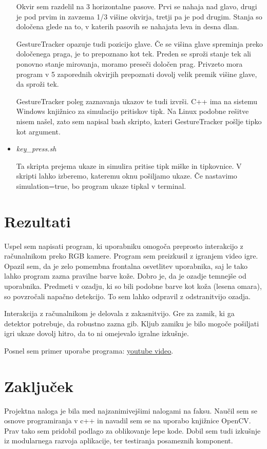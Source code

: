 \documentclass[a4paper, 12pt]{article}
\begin{document}
\begin{itemize}
Okvir sem razdelil na 3 horizontalne pasove. Prvi se nahaja nad glavo, drugi je pod prvim in zavzema 1/3 višine okvirja, tretji pa je pod drugim. Stanja so določena glede na to, v katerih pasovih se nahajata leva in desna dlan.

GestureTracker opazuje tudi pozicijo glave. Če se višina glave spreminja preko določenega praga, je to prepoznano kot tek. Preden se sproži stanje tek ali ponovno stanje mirovanja, moramo preseči določen prag. Privzeto mora program v 5 zaporednih okvirjih prepoznati dovolj velik premik višine glave, da sproži tek.

GestureTracker poleg zaznavanja ukazov te tudi izvrši. C++ ima na sistemu Windows knjižnico za simulacijo pritiskov tipk. Na Linux podobne rešitve nisem našel, zato sem napisal bash skripto, kateri GestureTracker pošlje tipko kot argument.

\item \emph{key\_press.sh}

Ta skripta prejema ukaze in simulira pritise tipk miške in tipkovnice. V skripti lahko izberemo, kateremu oknu pošiljamo ukaze. Če nastavimo simulation=true, bo program ukaze tipkal v terminal.

\end{itemize}


\section{Rezultati}

Uspel sem napisati program, ki uporabniku omogoča preprosto interakcijo z računalnikom preko RGB kamere. Program sem preizkusil z igranjem video igre. Opazil sem, da je zelo pomembna frontalna osvetlitev uporabnika, saj le tako lahko program zazna pravilne barve kože. Dobro je, da je ozadje temnejše od uporabnika. Predmeti v ozadju, ki so bili podobne barve kot koža (lesena omara), so povzročali napačno detekcijo. To sem lahko odpravil z odstranitvijo ozadja.

Interakcija z računalnikom je delovala z zakasnitvijo. Gre za zamik, ki ga detektor potrebuje, da robustno zazna gib. Kljub zamiku je bilo mogoče pošiljati igri ukaze dovolj hitro, da to ni omejevalo igralne izkušnje.

Posnel sem primer uporabe programa:
\href{https://www.youtube.com/watch?v=bAIwoVB_lPE}{youtube video}.

\section{Zaključek}

Projektna naloga je bila med najzanimivejšimi nalogami na faksu. Naučil sem se osnove programiranja v c++ in navadil sem se na uporabo knjižnice OpenCV. Prav tako sem pridobil podlago za oblikovanje lepe kode. Dobil sem tudi izkušnje iz modularnega razvoja aplikacije, ter testiranja posameznih komponent.
\end{document}
